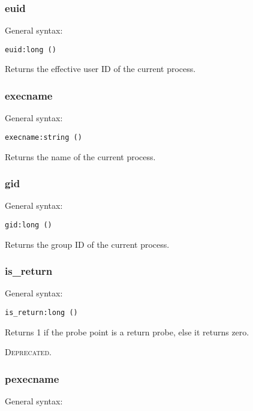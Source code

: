\documentclass[twoside,english]{article}
\newcommand{\noun}[1]{\textsc{#1}}
\newenvironment{vindent}
{\begin{list}{}{\setlength{\listparindent}{6pt}}
\item[]}
{\end{list}}
\begin{document}
\subsubsection{euid}
General syntax:

\begin{vindent}
\begin{verbatim}
euid:long ()
\end{verbatim}
\end{vindent}
Returns the effective user ID of the current process.


\subsubsection{execname}
General syntax:

\begin{vindent}
\begin{verbatim}
execname:string ()
\end{verbatim}
\end{vindent}
Returns the name of the current process.


\subsubsection{gid}
General syntax:

\begin{vindent}
\begin{verbatim}
gid:long ()
\end{verbatim}
\end{vindent}
Returns the group ID of the current process.


\subsubsection{is\_return}
General syntax:

\begin{vindent}
\begin{verbatim}
is_return:long ()
\end{verbatim}
\end{vindent}
Returns 1 if the probe point is a return probe, else it returns
zero.

\noun{Deprecated}.


\subsubsection{pexecname}
General syntax:
\end{document}
